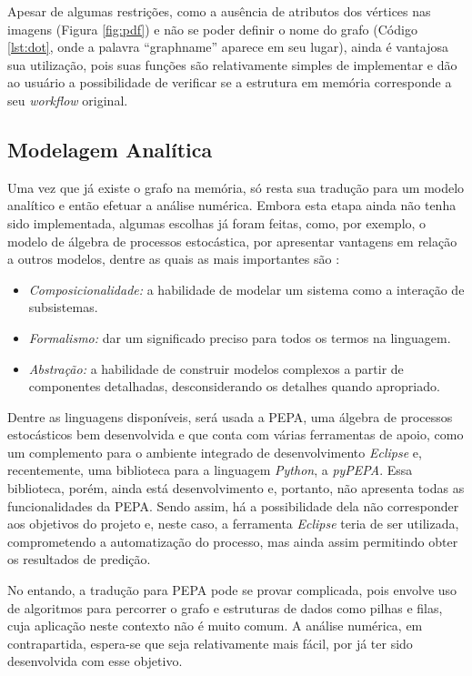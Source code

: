 \documentclass[a4paper,11pt]{article}
\begin{document}
  		Apesar de algumas restrições, como a ausência de atributos dos vértices nas imagens (Figura \ref{fig:pdf}) e não se poder definir o nome do grafo (Código \ref{lst:dot}, onde a palavra ``graphname'' aparece em seu lugar), ainda é vantajosa sua utilização, pois suas funções são relativamente simples de implementar e dão ao usuário a possibilidade de verificar se a estrutura em memória corresponde a seu \emph{workflow} original.

  	\subsection{Modelagem Analítica}
  		Uma vez que já existe o grafo na memória, só resta sua tradução para um modelo analítico e então efetuar a análise numérica. Embora esta etapa ainda não tenha sido implementada, algumas escolhas já foram feitas, como, por exemplo, o modelo de álgebra de processos estocástica, por apresentar vantagens em relação a outros modelos, dentre as quais as mais importantes são \cite{web:aboutpepa}:

  		\begin{itemize}
  			\item \emph{Composicionalidade:} a habilidade de modelar um sistema como a interação de subsistemas.
  			\item \emph{Formalismo:} dar um significado preciso para todos os termos na linguagem.
  			\item \emph{Abstração:} a habilidade de construir modelos complexos a partir de componentes detalhadas, desconsiderando os detalhes quando apropriado.
  		\end{itemize}

  		Dentre as linguagens disponíveis, será usada a PEPA, uma álgebra de processos estocásticos bem desenvolvida e que conta com várias ferramentas de apoio, como um complemento para o ambiente integrado de desenvolvimento \emph{Eclipse} e, recentemente, uma biblioteca para a linguagem \emph{Python}, a \emph{pyPEPA}. Essa biblioteca, porém, ainda está desenvolvimento e, portanto, não apresenta todas as funcionalidades da PEPA. Sendo assim, há a possibilidade dela não corresponder aos objetivos do projeto e, neste caso, a ferramenta \emph{Eclipse} teria de ser utilizada, comprometendo a automatização do processo, mas ainda assim permitindo obter os resultados de predição.

  		No entando, a tradução para PEPA pode se provar complicada, pois envolve uso de algoritmos para percorrer o grafo e estruturas de dados como pilhas e filas, cuja aplicação neste contexto não é muito comum. A análise numérica, em contrapartida, espera-se que seja relativamente mais fácil, por já ter sido desenvolvida com esse objetivo.
 
\end{document}
